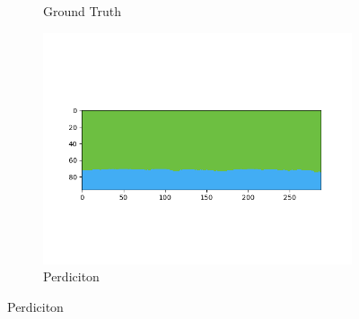 \documentclass[10pt,twocolumn,letterpaper]{article}
\begin{document}
\begin{figure}[hpt]
\begin{center}
\begin{subfigure}{0.3\textwidth}
  		\caption{Ground Truth}
  	\end{subfigure}
  		\hfill
  	\begin{subfigure}{0.3\textwidth}
  		\includegraphics[width=\linewidth,trim={1.25cm 1.5cm 1.5cm 1.25cm},clip]{perdiction1.png}
  		\caption{Perdiciton}
  \end{subfigure}
  

\end{center}
\end{figure}
\end{document}
